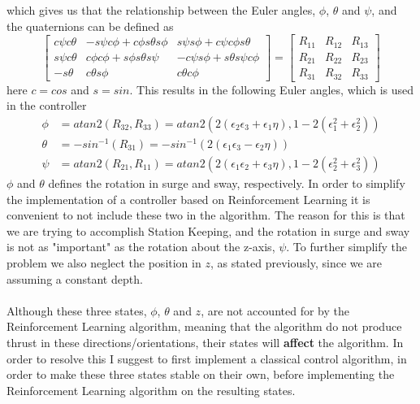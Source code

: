 which gives us that the relationship between the Euler angles, $\phi$, $\theta$ and $\psi$, and the quaternions can be defined as
\begin{equation}
    \begin{bmatrix}
    c\psi c\theta & -s\psi c \phi + c\phi s\theta s\phi & s\psi s\phi + c\psi c\phi s\theta \\ s\psi c\theta & c\phi c\phi + s\phi s\theta s\psi & -c\psi s\phi + s\theta s\psi c\phi \\ -s\theta & c\theta s\phi & c\theta c\phi 
    \end{bmatrix}
    = \begin{bmatrix}
    R_{11} & R_{12} & R_{13} \\ R_{21} & R_{22} & R_{23} \\ R_{31} & R_{32} & R_{33}
    \end{bmatrix}
\end{equation}
here $c = cos$ and $s = sin$. This results in the following Euler angles, which is used in the controller
\begin{align}
    \phi & = atan2(R_{32}, R_{33}) = atan2(2(\epsilon_{2}\epsilon_{3}+\epsilon_{1}\eta), 1 - 2(\epsilon_{1}^{2}+\epsilon_{2}^{2})) \\
    \theta & = -sin^{-1}(R_{31}) = -sin^{-1}(2(\epsilon_{1}\epsilon_{3}-\epsilon_{2}\eta)) \\
    \psi & = atan2(R_{21}, R_{11}) = atan2(2(\epsilon_{1}\epsilon_{2}+\epsilon_{3}\eta), 1 - 2(\epsilon_{2}^{2}+\epsilon_{3}^{2}))
\end{align}
$\phi$ and $\theta$ defines the rotation in surge and sway, respectively. In order to simplify the implementation of a controller based on Reinforcement Learning it is convenient to not include these two in the algorithm. The reason for this is that we are trying to accomplish Station Keeping, and the rotation in surge and sway is not as "important" as the rotation about the z-axis, $\psi$. To further simplify the problem we also neglect the position in $z$, as stated previously, since we are assuming a constant depth.\\\\
Although these three states, $\phi$, $\theta$ and $z$, are not accounted for by the Reinforcement Learning algorithm, meaning that the algorithm do not produce thrust in these directions/orientations, their states will \textbf{affect} the algorithm. In order to resolve this I suggest to first implement a classical control algorithm, in order to make these three states stable on their own, before implementing the Reinforcement Learning algorithm on the resulting states. 
